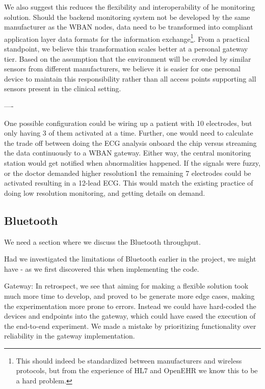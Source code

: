 We also suggest this reduces the flexibility and interoperability of he monitoring solution. Should the backend monitoring system not be developed by the same manufacturer as the WBAN nodes, data need to be transformed into compliant application layer data formats for the information exchange\footnote{ This should indeed be standardized between manufacturers and wireless protocols, but from the experience of HL7 and OpenEHR we know this to be a hard problem.}. From a practical standpoint, we believe this transformation scales better at a personal gateway tier. Based on the assumption that the environment will be crowded by similar sensors from different manufacturers, we believe it is easier for one personal device to maintain this responsibility rather than all access points supporting all sensors present in the clinical setting.

----


One possible configuration could be wiring up a patient with 10 electrodes, but only having 3 of them activated at a time. Further, one would need to calculate the trade off between doing the ECG analysis onboard the chip versus streaming the data continuously to a WBAN gateway. Either way, the central monitoring station would get notified when abnormalities happened. If the signals were fuzzy, or the doctor demanded higher resolution{1} the remaining 7 electrodes could be activated resulting in a 12-lead ECG. This would match the existing practice of doing low resolution monitoring, and getting details on demand.


\subsection{Bluetooth} %
\label{sub:bluetooth}

We need a section where we discuss the Bluetooth throughput.

Had we investigated the limitations of Bluetooth earlier in the project, we might have - as we first discovered this when implementing the code.

Gateway: In retrospect, we see that aiming for making a flexible solution took much more time to develop, and proved to be generate more edge cases, making the experimentation more prone to errors. Instead we could have hard-coded the devices and endpoints into the gateway, which could have eased the execution of the end-to-end experiment. We made a mistake by prioritizing functionality over reliability in the gateway implementation.

